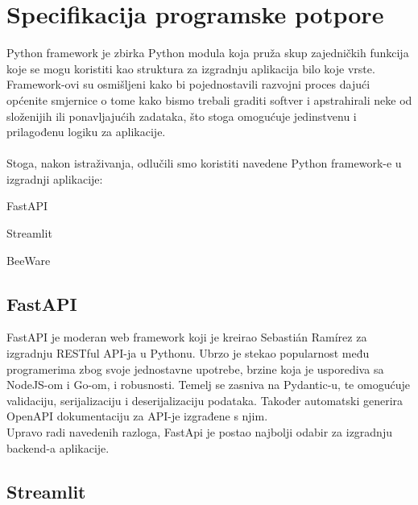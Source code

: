 \chapter{Specifikacija programske potpore}
	Python framework je zbirka Python modula koja pruža skup zajedničkih funkcija koje se mogu koristiti kao struktura za izgradnju aplikacija bilo koje vrste.\\
	Framework-ovi su osmišljeni kako bi pojednostavili razvojni proces dajući općenite smjernice o tome kako bismo trebali graditi softver i apstrahirali neke od složenijih ili ponavljajućih zadataka, što stoga omogućuje jedinstvenu i prilagođenu logiku za aplikacije.\\
	\\
	Stoga, nakon istraživanja, odlučili smo koristiti navedene Python framework-e u izgradnji aplikacije:

	\begin{packed_enum}

		\item FastAPI
		\item Streamlit
		\item BeeWare

	\end{packed_enum}

	\bigskip

	\section{FastAPI}

	FastAPI je moderan web framework koji je kreirao Sebastián Ramírez za izgradnju RESTful API-ja u Pythonu. Ubrzo je stekao popularnost među programerima zbog svoje jednostavne upotrebe, brzine koja je usporediva sa NodeJS-om i Go-om, i robusnosti. Temelj se zasniva na Pydantic-u, te omogućuje validaciju, serijalizaciju i deserijalizaciju podataka. Također automatski generira OpenAPI dokumentaciju za API-je izgrađene s njim.\\
	Upravo radi navedenih razloga, FastApi je postao najbolji odabir za izgradnju backend-a aplikacije.

	\bigskip

	\section{Streamlit}

